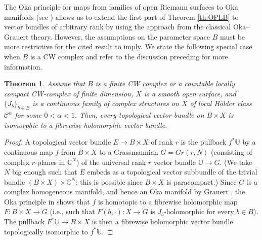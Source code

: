 \documentclass[11pt]{amsart}
\numberwithin{equation}{section}
\newtheorem{theorem}{Theorem}[section]
\theoremstyle{definition}
\newcommand\Cscr{\mathscr{C}}
\newcommand\C{\mathbb{C}}
\newcommand\U{\mathbb{U}}
\begin{document}
%
%
The Oka principle for maps from families of open Riemann surfaces
to Oka manifolds (see \cite[Theorem 1.6]{Forstneric2024Runge}) 
allows us to extend the first part of Theorem \ref{th:OPLB} 
to vector bundles of arbitrary rank by using the approach from 
the classical Oka--Grauert theory. However, the assumptions
on the parameter space $B$ must be more restrictive for 
the cited result to imply. We state the following special case 
when $B$ is a CW complex and refer to the discussion preceding 
\cite[Theorem 1.6]{Forstneric2024Runge} for more information.


%
%
\begin{theorem}\label{th:OPvectorbundles} 
Assume that $B$ is a finite CW complex or a countable locally 
compact CW-complex of finite dimension, $X$ 
is a smooth open surface, and $\{J_b\}_{b\in B}$ is  
a continuous family of complex structures on 
$X$ of local H\"older class $\Cscr^\alpha$ for some $0<\alpha<1$.
Then, every topological vector bundle on $B\times X$ is isomorphic 
to a fibrewise holomorphic vector bundle. 
\end{theorem}

\begin{proof}
A topological vector bundle $E\to B \times X$ of rank $r$
is the pullback $f^*\U$ 
by a continuous map $f$ from $B \times X$ to a 
Grassmannian $G=Gr(r,N)$ (consisting of complex
$r$-planes in $\C^N$) of the universal rank $r$ vector bundle $\U\to G$.
(We take $N$ big enough such that $E$ embeds as a topological
vector subbundle of the trivial bundle $(B \times X)\times \C^N$;
this is possible since $B \times X$ is paracompact.)
Since $G$ is a complex homogeneous manifold, and hence an 
Oka manifold by Grauert \cite{Grauert1957II}, 
the Oka principle in \cite[Theorem 1.6]{Forstneric2024Runge}
shows that $f$ is homotopic to a fibrewise holomorphic map 
$F:B\times X\to G$ (i.e., such that $F(b,\cdotp):X\to G$ is $J_b$-holomorphic 
for every $b \in B$). The pullback $F^*\U\to B\times X$ is then a fibrewise 
holomorphic vector bundle topologically isomorphic to $f^*\U$. 
\end{proof}
\end{document}
